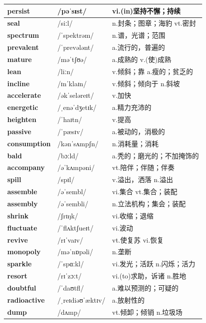 \documentclass[14pt,a4paper]{extarticle}
\begin{document}
\begin{longtable}{ p{} p{} p{} }
\textbf{persist} & /pəˈsɪst/ & vi.(in)坚持不懈；持续 \\ \hline
\textbf{seal} & /siːl/ & n.封条；图章；海豹 \quad vt.密封 \\ \hline
\textbf{spectrum} & /ˈspektrəm/ & n.谱，光谱；范围 \\ \hline
\textbf{prevalent} & /ˈprevələnt/ & a.流行的，普遍的 \\ \hline
\textbf{mature} & /məˈtʃʊə/ & a.成熟的 \quad v.(使)成熟 \\ \hline
\textbf{lean} & /liːn/ & v.倾斜；靠 \quad a.瘦的；贫乏的 \\ \hline
\textbf{incline} & /ɪnˈklaɪn/ & v.倾斜；倾向于 \quad n.斜坡 \\ \hline
\textbf{accelerate} & /əkˈseləreɪt/ & v.加快 \\ \hline
\textbf{energetic} & /ˌenəˈdʒetɪk/ & a.精力充沛的 \\ \hline
\textbf{heighten} & /ˈhaɪtn/ & v.提高 \\ \hline
\textbf{passive} & /ˈpæsɪv/ & a.被动的，消极的 \\ \hline
\textbf{consumption} & /kənˈsʌmpʃn/ & n.消耗量；消耗 \\ \hline
\textbf{bald} & /bɔːld/ & a.秃的；磨光的；不加掩饰的 \\ \hline
\textbf{accompany} & /əˈkʌmpəni/ & vt.陪伴；伴随；伴奏 \\ \hline
\textbf{spill} & /spɪl/ & v.溢出，洒落 \quad n.溢出 \\ \hline
\textbf{assemble} & /əˈsembl/ & vi.集合 \quad vt.集合；装配 \\ \hline
\textbf{assembly} & /əˈsembli/ & n.立法机构；集会；装配 \\ \hline
\textbf{shrink} & /ʃrɪŋk/ & vi.收缩；退缩 \\ \hline
\textbf{fluctuate} & /ˈflʌktʃueɪt/ & vi.波动 \\ \hline
\textbf{revive} & /rɪˈvaɪv/ & vt.使复苏 \quad vi.恢复 \\ \hline
\textbf{monopoly} & /məˈnɒpəli/ & n.垄断 \\ \hline
\textbf{sparkle} & /ˈspɑːkl/ & vi.发光；活跃 \quad n.闪烁；活力 \\ \hline
\textbf{resort} & /rɪˈzɔːt/ & vi.(to)求助，诉诸 \quad n.胜地 \\ \hline
\textbf{doubtful} & /ˈdaʊtfl/ & a.难以预测的；可疑的 \\ \hline
\textbf{radioactive} & /ˌreɪdiəʊˈæktɪv/ & a.放射性的 \\ \hline
\textbf{dump} & /dʌmp/ & vt.倾卸；倾销 \quad n.垃圾场 \\ \hline

\end{longtable}
\end{document}
